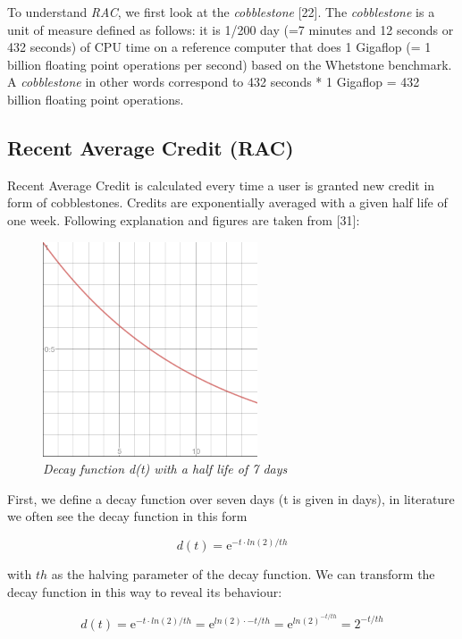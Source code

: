 To understand \textit{RAC}, we first look at the \textit{cobblestone} [22]. The \textit{cobblestone} is a unit of measure defined as follows: it is 1/200 day (=7 minutes and 12 seconds or 432 seconds) of CPU time on a reference computer that does 1 Gigaflop (= 1 billion floating point operations per second) based on the Whetstone benchmark. A \textit{cobblestone} in other words correspond to 432 seconds * 1 Gigaflop = 432 billion floating point operations.\\


\subsection{Recent Average Credit (RAC)}

Recent Average Credit is calculated every time a user is granted new credit in form of cobblestones. Credits are exponentially averaged with a given half life of one week. Following explanation and figures are taken from [31]:\\

\begin{figure}
\centering
\includegraphics[scale=0.7]{figures/halflife}
\medskip
\caption{\textit{Decay function d(t) with a half life of 7 days }}
\small
\end{figure}


First, we define a decay function over seven days (t is given in days), in literature we often see the decay function in this form

\begin{equation}
d(t) =  \mathrm{e}^{-t \cdot  ln(2) / th}  
\end{equation}

with $th$ as the halving parameter of the decay function. We can transform the decay function in this way to reveal its behaviour:

\begin{equation}
d(t) =  \mathrm{e}^{-t \cdot  ln(2) / th} = \mathrm{e}^{ln(2) \cdot  -t/th} = \mathrm{e}^{ln(2)^{-t/th}} = 2^{-t/th}
\end{equation}

